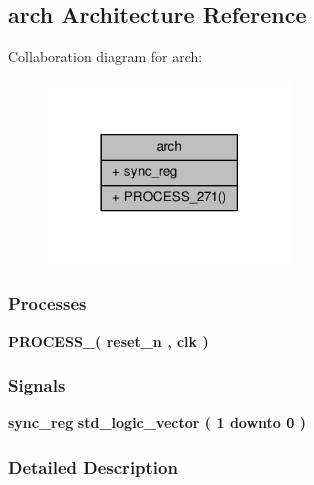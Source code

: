 \subsection{arch Architecture Reference}
\label{classsync__reg_1_1arch}


Collaboration diagram for arch\+:\nopagebreak
\begin{figure}[H]
\begin{center}
\leavevmode
\includegraphics[width=182pt]{d7/d9d/classsync__reg_1_1arch__coll__graph}
\end{center}
\end{figure}
\subsubsection*{Processes}
 \begin{DoxyCompactItemize}
\item 
{\bf P\+R\+O\+C\+E\+S\+S\+\_}{\bfseries  ( {\bfseries {\bfseries {\bf reset\+\_\+n}} \textcolor{vhdlchar}{ }} , {\bfseries {\bfseries {\bf clk}} \textcolor{vhdlchar}{ }} )}
\end{DoxyCompactItemize}
\subsubsection*{Signals}
 \begin{DoxyCompactItemize}
\item 
{\bf sync\+\_\+reg} {\bfseries \textcolor{comment}{std\+\_\+logic\+\_\+vector}\textcolor{vhdlchar}{ }\textcolor{vhdlchar}{(}\textcolor{vhdlchar}{ }\textcolor{vhdlchar}{ } \textcolor{vhdldigit}{1} \textcolor{vhdlchar}{ }\textcolor{keywordflow}{downto}\textcolor{vhdlchar}{ }\textcolor{vhdlchar}{ } \textcolor{vhdldigit}{0} \textcolor{vhdlchar}{ }\textcolor{vhdlchar}{)}\textcolor{vhdlchar}{ }} 
\end{DoxyCompactItemize}


\subsubsection{Detailed Description}



